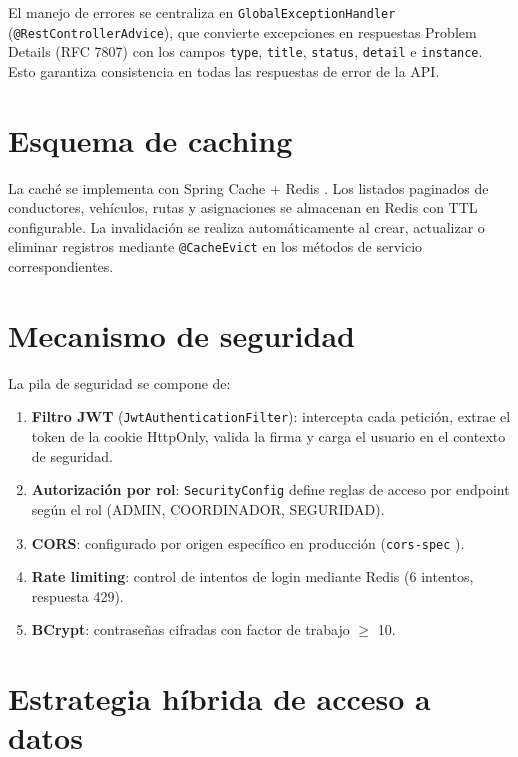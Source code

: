 El manejo de errores se centraliza en \texttt{GlobalExceptionHandler} (\texttt{@RestControllerAdvice}), que convierte excepciones en respuestas Problem Details (RFC 7807) \cite{rfc7807} con los campos \texttt{type}, \texttt{title}, \texttt{status}, \texttt{detail} e \texttt{instance}. Esto garantiza consistencia en todas las respuestas de error de la API.

\section{Esquema de caching}
\label{sec:caching}

La caché se implementa con Spring Cache + Redis \cite{redis}. Los listados paginados de conductores, vehículos, rutas y asignaciones se almacenan en Redis con TTL configurable. La invalidación se realiza automáticamente al crear, actualizar o eliminar registros mediante \texttt{@CacheEvict} en los métodos de servicio correspondientes.

\section{Mecanismo de seguridad}
\label{sec:seguridad-impl}

La pila de seguridad se compone de:

\begin{enumerate}
  \item \textbf{Filtro JWT} (\texttt{JwtAuthenticationFilter}): intercepta cada petición, extrae el token de la cookie HttpOnly, valida la firma y carga el usuario en el contexto de seguridad.
  \item \textbf{Autorización por rol}: \texttt{SecurityConfig} define reglas de acceso por endpoint según el rol (ADMIN, COORDINADOR, SEGURIDAD).
  \item \textbf{CORS}: configurado por origen específico en producción (\texttt{cors-spec} \cite{cors-spec}).
  \item \textbf{Rate limiting}: control de intentos de login mediante Redis (6 intentos, respuesta 429).
  \item \textbf{BCrypt}: contraseñas cifradas con factor de trabajo $\geq$ 10.
\end{enumerate}

\section{Estrategia híbrida de acceso a datos}
\label{sec:acceso-datos-impl}

